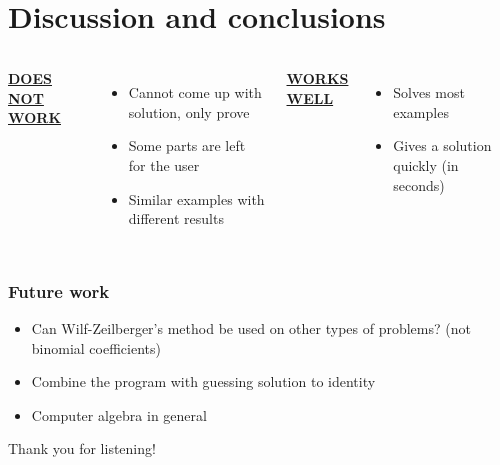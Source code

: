 \documentclass{beamer}
\newcommand{\ubf}[1]{\underline{\textbf{#1}}}
\begin{document}
\section{Discussion and conclusions}
\begin{frame}
  \begin{columns}[t]

  \center
  \ubf{DOES NOT WORK}

  \justify
  \begin{itemize}
    \item<2-> Cannot come up with solution, only prove
    \item<3-> Some parts are left for the user
    \item<4-> Similar examples with different results
  \end{itemize}
  \center
  \ubf{WORKS WELL}

  \justify
  \begin{itemize}
    \item<5-> Solves most examples
    \item<6-> Gives a solution quickly (in seconds)
  \end{itemize}
  \end{columns}
\end{frame}
\begin{frame}
  \frametitle{Future work}
  \pause
  \begin{itemize}
    \item Can Wilf-Zeilberger's method be used on other types of problems? (not binomial coefficients)
    \pause
    \item Combine the program with guessing solution to identity
    \pause
    \item Computer algebra in general
  \end{itemize}
\end{frame}
\begin{frame}
  \Huge\center
  Thank you for listening!
\end{frame}

\appendix
\end{document}
